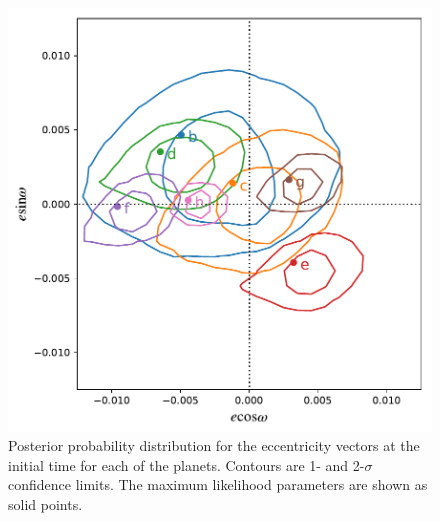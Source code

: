 \documentclass[twocolumn]{aastex63}
\begin{document}
\begin{figure}
    \centering
    \includegraphics[width=\hsize]{figures/esin_vs_ecos.pdf}
    \caption{Posterior probability distribution for the eccentricity vectors  at the
    initial time for each of the planets.  Contours are 1- and 2-$\sigma$ confidence limits.  
    The maximum likelihood parameters are shown as solid points.}
    \label{fig:eccentricity_vectors}
\end{figure}
\end{document}

